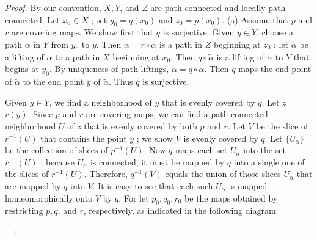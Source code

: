 \begin{proof}
	By our convention, \(X,Y\), and \(Z\) are path connected and locally path connected. Let \(x_{0} \in X\) ; set \(y_{0} = q( x_{0})\) and \(z_{0} = p( x_{0})\).
(a) Assume that \(p\) and \(r\) are covering maps. We show first that \(q\) is surjective. Given \(y \in Y\), choose a path \(\widetilde{\alpha }\) in \(Y\) from \(y_{0}\) to \(y\). Then \(\alpha = r \circ \widetilde{\alpha }\) is a path in \(Z\) beginning at \(z_{0}\) ; let \(\widetilde{\alpha }\) be a lifting of \(\alpha\) to a path in \(X\) beginning at \(x_{0}\). Then \(q \circ \widetilde{\alpha }\) is a lifting of \(\alpha\) to \(Y\) that begins at \(y_{0}\). By uniqueness of path liftings, \(\widetilde{\alpha } = q \circ \widetilde{\alpha }\). Then \(q\) maps the end point of \(\widetilde{\alpha }\) to the end point \(y\) of \(\widetilde{\alpha }\). Thus \(q\) is surjective.

Given \(y \in Y\), we find a neighborhood of \(y\) that is evenly covered by \(q\). Let \(z =\) \(r( y)\). Since \(p\) and \(r\) are covering maps, we can find a path-connected neighborhood \(U\) of \(z\) that is evenly covered by both \(p\) and \(r\). Let \(V\) be the slice of \(r^{-1}( U)\) that contains the point \(y\) ; we show \(V\) is evenly covered by \(q\). Let \(\{ U_{\alpha }\}\) be the collection of slices of \(p^{-1}( U)\). Now \(q\) maps each set \(U_{\alpha }\) into the set \(r^{-1}( U)\) ; because \(U_{\alpha }\) is connected, it must be mapped by \(q\) into a single one of the slices of \(r^{-1}( U)\). Therefore, \(q^{-1}( V)\) equals the union of those slices \(U_{\alpha }\) that are mapped by \(q\) into \(V\). It is easy to see that each such \(U_{\alpha }\) is mapped homeomorphically onto \(V\) by \(q\). For let \(p_{0},q_{0},r_{0}\) be the maps obtained by restricting \(p,q\), and \(r\), respectively, as indicated in the following diagram:

\par\nopagebreak
\begin{center}
	\label{fig:com_80_2}
\end{center}
\par\nopagebreak 


\end{proof}
